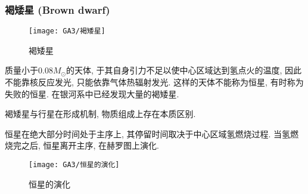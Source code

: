 \subsubsection{褐矮星 (Brown dwarf)}

\begin{figure}[!htb]
    \centering
    \texttt{[image: GA3/褐矮星]}
    \caption{褐矮星}
\end{figure}


质量小于$0.08M_{\odot}$的天体, 于其自身引力不足以使中心区域达到氢点火的温度, 因此不能靠核反应发光, 只能依靠气体热辐射发光. 这样的天体不能称为恒星, 有时称为失败的恒星. 在银河系中已经发现大量的褐矮星. 

褐矮星与行星在形成机制, 物质组成上存在本质区别. 

恒星在绝大部分时间处于主序上, 其停留时间取决于中心区域氢燃烧过程. 当氢燃烧完之后, 恒星离开主序, 在赫罗图上演化. 

\begin{figure}[!htb]
    \centering
    \texttt{[image: GA3/恒星的演化]}
    \caption{恒星的演化}
\end{figure}


